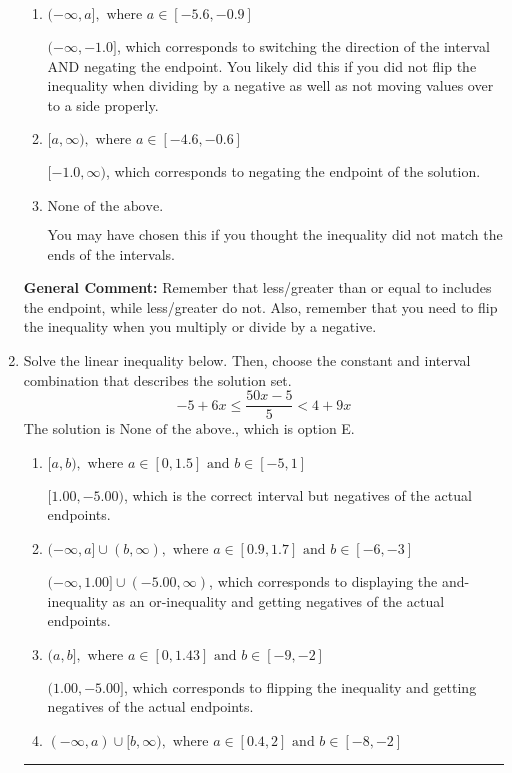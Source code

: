 \documentclass{extbook}[14pt]
\newcommand{\litem}[1]{\item #1

\rule{\textwidth}{0.4pt}}
\begin{document}
\begin{enumerate}
{\begin{enumerate}[label=\Alph*.]
 $(-\infty, 1.0]$, which corresponds to switching the direction of the interval. You likely did this if you did not flip the inequality when dividing by a negative!
\item \( (-\infty, a], \text{ where } a \in [-5.6, -0.9] \)

 $(-\infty, -1.0]$, which corresponds to switching the direction of the interval AND negating the endpoint. You likely did this if you did not flip the inequality when dividing by a negative as well as not moving values over to a side properly.
\item \( [a, \infty), \text{ where } a \in [-4.6, -0.6] \)

 $[-1.0, \infty)$, which corresponds to negating the endpoint of the solution.
\item \( \text{None of the above}. \)

You may have chosen this if you thought the inequality did not match the ends of the intervals.
\end{enumerate}

\textbf{General Comment:} Remember that less/greater than or equal to includes the endpoint, while less/greater do not. Also, remember that you need to flip the inequality when you multiply or divide by a negative.
}
\litem{
Solve the linear inequality below. Then, choose the constant and interval combination that describes the solution set.
\[ -5 + 6 x \leq \frac{50 x - 5}{5} < 4 + 9 x \]
The solution is \( \text{None of the above.} \), which is option E.\begin{enumerate}[label=\Alph*.]
\item \( [a, b), \text{ where } a \in [0, 1.5] \text{ and } b \in [-5, 1] \)

$[1.00, -5.00)$, which is the correct interval but negatives of the actual endpoints.
\item \( (-\infty, a] \cup (b, \infty), \text{ where } a \in [0.9, 1.7] \text{ and } b \in [-6, -3] \)

$(-\infty, 1.00] \cup (-5.00, \infty)$, which corresponds to displaying the and-inequality as an or-inequality and getting negatives of the actual endpoints.
\item \( (a, b], \text{ where } a \in [0, 1.43] \text{ and } b \in [-9, -2] \)

$(1.00, -5.00]$, which corresponds to flipping the inequality and getting negatives of the actual endpoints.
\item \( (-\infty, a) \cup [b, \infty), \text{ where } a \in [0.4, 2] \text{ and } b \in [-8, -2] \)


\end{enumerate}}
\end{enumerate}
\end{document}
